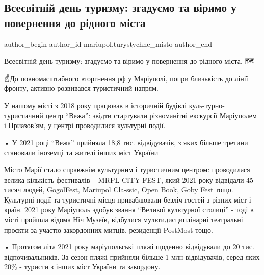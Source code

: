  
 
 
 
 

\subsection{Всесвітній день туризму: згадуємо та віримо у повернення до рідного міста}
\label{sec:27_09_2023.fb.mariupol.turystychne_misto.1.vsesvitnii_den_turyzmu_povernennja}

\ifcmt
 author_begin
   author_id mariupol.turystychne_misto
 author_end
\fi

Всесвітній день туризму: згадуємо та віримо у повернення до рідного міста. 🗺️

☝️До повномасштабного вторгнення рф у Маріуполі, попри близькість до лінії
фронту, активно розвивався туристичний напрям. 

У нашому місті з 2018 року працював в історичній будівлі куль\hyp{}турно-туристичний
центр \enquote{Вежа}: звідти стартували різноманітні екскурсії Маріуполем і Приазов'ям,
у центрі проводилися культурні події. 

• У 2021 році \enquote{Вежа} прийняла 18,8 тис. відвідувачів, з яких більше третини
становили іноземці та жителі інших міст України 

Місто Марії стало справжнім культурним і туристичним центром: проводилася
велика кількість фестивалів – MRPL CITY FEST, який 2021 року відвідали 45 тисяч
людей, GogolFest, Mariupol Cla\hyp{}ssic, Open Book, Goby Fest тощо. Культурні події
та туристичні місця приваблювали безліч гостей з різних міст і країн. 2021 року
Маріуполь здобув звання \enquote{Великої культурної столиці} - тоді в місті пройшла
відома Ніч Музеїв, відбулися мультидисциплінарні театральні проєкти за участю
закордонних митців, резиденції PostMost тощо.

• Протягом літа 2021 року маріупольські пляжі щоденно відвідували до 20 тис.
відпочивальників. За сезон пляжі прийняли більше 1 млн відвідувачів, серед яких
20\% - туристи з інших міст України та закордону.  


